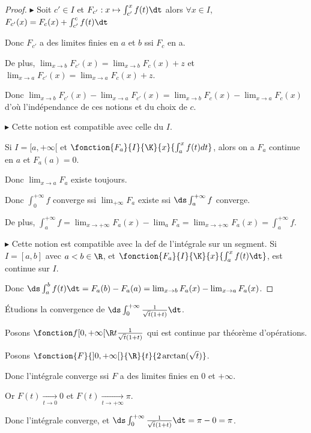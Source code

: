 \begin{proof}
    $\blacktriangleright$ Soit $c' \in I$ et $F_{c'} : x \mapsto \int_{c' }^{x } f(t) \dt$ alors 
    $\forall x \in I$, $F_{c'}(x) = F_c(x) + \int_{c'}^{c} f(t) \dt$ 

    Donc $F_{c'}$ a des limites finies en $a$ et $b$ ssi $F_c$ en a. 

    De plus, $\lim_{x \to b} F_{c'}(x) = \lim_{x \to b} F_c(x)  + z$ et 
    $\lim_{x \to a} F_{c'}(x) = \lim_{x \to a} F_c(x) + z$. 

    Donc $\lim_{x \to b} F_{c'}(x) - \lim_{x \to a} F_{c'}(x) = \lim_{x \to b} F_c(x) - \lim_{x \to a} F_c(x)$
    d'où l'indépendance de ces notions et du choix de $c$. 

    \lvspace $\blacktriangleright$ Cette notion est compatible avec celle du $I$. 

    Si $I =[a, + \infty[$ et $\fonction {F_a}{I}{\K}{x}{\int_a^x f(t) dt}$, alors on a 
    $F_a$ continue en $a$ et $F_a(a) = 0 $.
    
    Donc $\lim_{x \to a} F_a$ existe toujours. 

    Donc $\int_{0}^{+ \infty   } f$ converge ssi $\lim_{+\infty   } F_a$ existe ssi 
    $\ds \int_{a }^{+ \infty   } f$ converge.

    De plus, $\int_{a }^{+ \infty   } f = \lim_{x \to + \infty   } F_a(x) - \lim_{a } F_a = \lim_{x \to + \infty  } F_a(x) = \int_{a }^{+ \infty   } f$.


    \lvspace $\blacktriangleright$ Cette notion est compatible avec la def de l'intégrale sur un segment. 
    Si $I = [a, b]$ avec $a < b \in \R$, et $\fonction{F_a}{I}{\K}{x}{\int_a^x f(t) \dt}$, 
    est continue sur $I$.

    Donc $\ds \int_{a }^{b } f(t) \dt = F_a(b) - F_a(a) = \lim_{x \to b} F_a(x) - \lim_{x \to a} F_a(x)$.
\end{proof}

\begin{exemple}
    Étudions la convergence de $\ds \int_0^{+ \infty} \frac 1 {\sqrt t (1 + t)} \dt$.

    Posons $\fonction f {[0, + \infty[}{\R}{t}{\frac 1 {\sqrt t (1 + t)}}$ qui est continue par théorème d'opérations.

    Posons $\fonction{F}{]0, + \infty[}{\R}{t}{2 \arctan(\sqrt t)}$.

    Donc l'intégrale converge ssi $F$ a des limites finies en $0$ et $+\infty$.

    Or $F(t) \xrightarrow[t \to 0   ]{} 0$ et $F(t) \xrightarrow[t \to + \infty   ]{} \pi$.

    Donc l'intégrale converge, et $\ds \int_{0}^{+ \infty   } \frac 1 {\sqrt t (1 + t)} \dt = \pi - 0 = \pi$.
\end{exemple}


